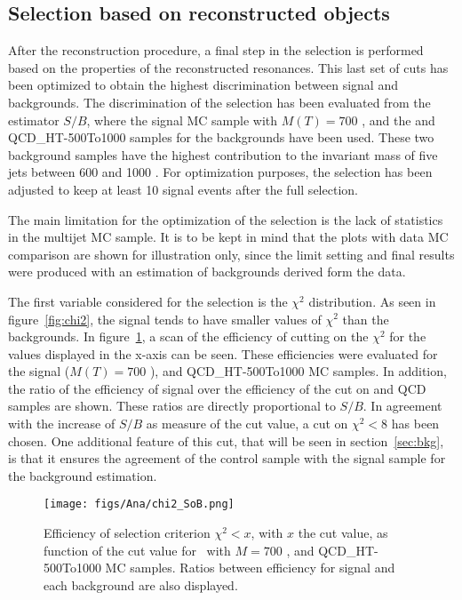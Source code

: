 \subsection{Selection based on reconstructed objects}
\label{sec:finalsel}

After the reconstruction procedure, a final step in the selection is performed based on the properties of the reconstructed resonances. This last set of cuts has been optimized to obtain the highest discrimination between signal and backgrounds. The discrimination of the selection has been evaluated from the estimator $S/B$, where the signal MC sample with $M(T)=700$ \GeVcc, and the \ttbar and QCD\_HT-500To1000 samples for the backgrounds have been used. These two background samples have the highest contribution to the invariant mass of five jets between 600 and 1000 \GeVcc. For optimization purposes, the selection has been adjusted to keep at least 10 signal events after the full selection.

The main limitation for the optimization of the selection is the lack of statistics in the multijet MC sample. It is to be kept in mind that the plots with data MC comparison are shown for illustration only, since the limit setting and final results were produced with an estimation of backgrounds derived form the data.

The first variable considered for the selection is the $\chi^{2}$ distribution. As seen in figure~\ref{fig:chi2}, the signal tends to have smaller values of $\chi^{2}$ than the backgrounds. In figure~\ref{fig:chi2cut}, a scan of the efficiency of cutting on the $\chi^{2}$ for the values displayed in the x-axis can be seen. These efficiencies were evaluated for the signal ($M(T)=700$ \GeVcc), \ttbar and QCD\_HT-500To1000 MC samples. In addition, the ratio of the efficiency of signal over the efficiency of the cut on \ttbar and QCD samples are shown. These ratios are directly proportional to $S/B$. In agreement with the increase of $S/B$ as measure of the cut value, a cut on $\chi^{2}<8$ has been chosen. One additional feature of this cut, that will be seen in section~\ref{sec:bkg}, is that it ensures the agreement of the control sample with the signal sample for the background estimation. 

\begin{figure}[!Hhtbp]
  \begin{center}
    \texttt{[image: figs/Ana/chi2\_SoB.png]}
    \caption{Efficiency of selection criterion $\chi^{2}<x$, with $x$ the cut value, as function of the cut value for \Tp~with $M=700$ \GeVcc, \ttbar and QCD\_HT-500To1000 MC samples. Ratios between efficiency for signal and each background are also displayed.}
    \label{fig:chi2cut}
  \end{center}
\end{figure}

